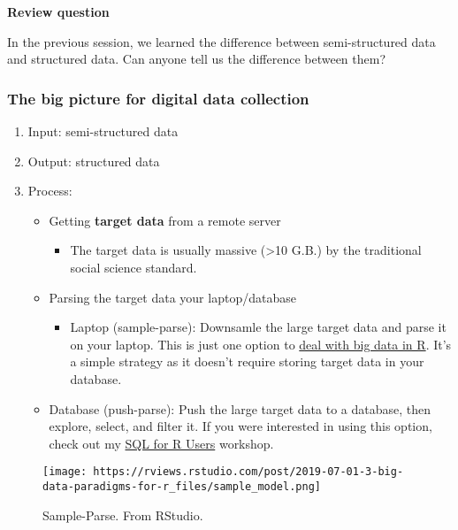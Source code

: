 \documentclass[
]{book}
\providecommand{\tightlist}{%
  \setlength{\itemsep}{0pt}\setlength{\parskip}{0pt}}
\begin{document}
\textbf{Review question}

In the previous session, we learned the difference between semi-structured data and structured data. Can anyone tell us the difference between them?

\hypertarget{the-big-picture-for-digital-data-collection}{%
\subsubsection{The big picture for digital data collection}\label{the-big-picture-for-digital-data-collection}}

\begin{enumerate}
\def\labelenumi{\arabic{enumi}.}
\item
  Input: semi-structured data
\item
  Output: structured data
\item
  Process:

  \begin{itemize}
  \item
    Getting \textbf{target data} from a remote server

    \begin{itemize}
    \tightlist
    \item
      The target data is usually massive (\textgreater10 G.B.) by the traditional social science standard.
    \end{itemize}
  \item
    Parsing the target data your laptop/database

    \begin{itemize}
    \tightlist
    \item
      Laptop (sample-parse): Downsamle the large target data and parse it on your laptop. This is just one option to \href{https://rviews.rstudio.com/2019/07/17/3-big-data-strategies-for-r/}{deal with big data in R}. It's a simple strategy as it doesn't require storing target data in your database.
    \end{itemize}
  \item
    Database (push-parse): Push the large target data to a database, then explore, select, and filter it. If you were interested in using this option, check out my \href{https://github.com/dlab-berkeley/sql-for-r-users}{SQL for R Users} workshop.
  \end{itemize}
\end{enumerate}

\begin{figure}
\centering
\texttt{[image: https://rviews.rstudio.com/post/2019-07-01-3-big-data-paradigms-for-r\_files/sample\_model.png]}
\caption{Sample-Parse. From RStudio.}
\end{figure}
\end{document}
